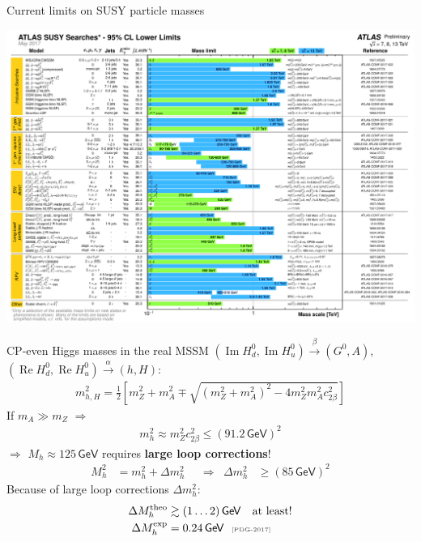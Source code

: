 \documentclass[hyperref={pdfpagelabels=false},ngerman]{beamer}
\newcommand{\eh}[1]{\,\mathsf{#1}}
\newcommand{\mycite}[1]{\ensuremath{\text{\textcolor{darkgray}{\tiny [#1]}}}}
\DeclareMathOperator{\re}{Re}
\DeclareMathOperator{\im}{Im}
\renewcommand{\emph}{\textbf}
\begin{document}
\begin{frame}{Current limits on SUSY particle masses}
  \begin{center}
    \includegraphics[width=\textwidth]{images/ATLAS_SUSY_Summary}
  \end{center}
\end{frame}

\begin{frame}{CP-even Higgs masses in the real MSSM}
  $\left(\im H_d^0, \im H_u^0\right) \overset{\beta}{\rightarrow} (G^0, A)$,
  $\left(\re H_d^0, \re H_u^0\right) \overset{\alpha}{\rightarrow} (h, H)$:
  \begin{align*}
    m_{h,H}^2 = \frac{1}{2} \left[
      m_Z^2 + m_A^2 \mp \sqrt{(m_Z^2 + m_A^2)^2 - 4 m_Z^2 m_A^2 c_{2\beta}^2}
    \right]
  \end{align*}
  If $m_A \gg m_Z$ $\Rightarrow$
  \begin{align*}
    m_h^2 \approx m_Z^2 c_{2\beta}^2
    \leq (91.2 \eh{GeV})^2
  \end{align*}
  $\Rightarrow$ $M_h \approx 125\eh{GeV}$ requires \emph{large loop
    corrections}!
  \begin{align*}
    M_h^2 &= m_h^2 + \Delta m_h^2
    & &\Rightarrow &
    \Delta m_h^2 &\geq (85\eh{GeV})^2
  \end{align*}
  Because of large loop corrections $\Delta m_h^2$:
  \begin{align*}
    \Delta M_h^{\text{theo}} &\gtrsim (1\ldots 2)\eh{GeV} \quad \text{at least!} \\
    \Delta M_h^{\text{exp}} &= 0.24\eh{GeV} \ \ \mycite{PDG-2017}
  \end{align*}
\end{frame}
\end{document}
